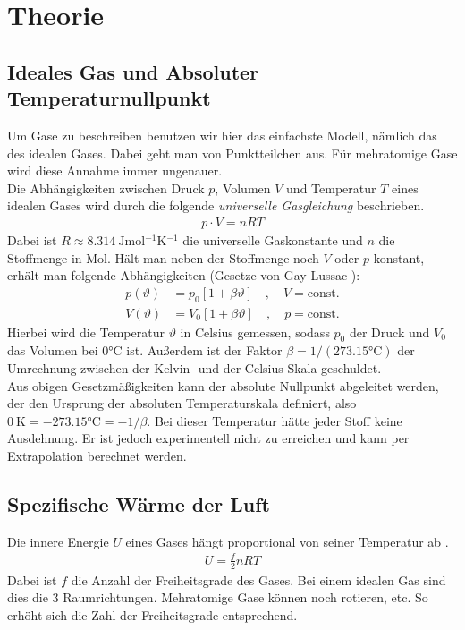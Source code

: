 \documentclass[12pt,a4paper,titlepage,headinclude,bibtotoc]{scrartcl}
\begin{document}
\section{Theorie}
\label{sec:theorie}
\subsection{Ideales Gas und Absoluter Temperaturnullpunkt}
Um Gase zu beschreiben benutzen wir hier das einfachste Modell, nämlich das des idealen Gases.
Dabei geht man von Punktteilchen aus.
Für mehratomige Gase wird diese Annahme immer ungenauer.\\
Die Abhängigkeiten zwischen Druck $p$, Volumen $V$ und Temperatur $T$ eines idealen Gases wird durch die folgende \textit{universelle Gasgleichung} \cite[S.261]{gerthsen} beschrieben.
\begin{align}
 p \cdot V = nRT
 \label{eq:uGasGl}
\end{align}
Dabei ist $R\approx 8.314 ~ \si{\joule \mol^{-1} \kelvin^{-1}}$ die universelle Gaskonstante und $n$ die Stoffmenge in Mol.
Hält man neben der Stoffmenge noch $V$ oder $p$ konstant, erhält man folgende Abhängigkeiten (Gesetze von Gay-Lussac \cite[S.261]{gerthsen}):
\begin{align}
	p(\vartheta)&=p_0 [1+\beta\vartheta] \quad, \quad V =\text{const.}
	\label{eq:p(T)}\\
	V(\vartheta)&=V_0 [1+\beta\vartheta] \quad, \quad p=\text{const.}	
\end{align}
Hierbei wird die Temperatur $\vartheta$ in Celsius gemessen, sodass $p_0$ der Druck und $V_0$ das Volumen bei $0\si{\celsius}$ ist.
Außerdem ist der Faktor $\beta=1/(273.15 \si{\celsius})$ der Umrechnung zwischen der Kelvin- und der Celsius-Skala geschuldet.\\
Aus obigen Gesetzmäßigkeiten kann der absolute Nullpunkt abgeleitet werden, der den Ursprung der absoluten Temperaturskala definiert, also $0~\si{\kelvin}=-273.15 \si{\celsius}=-1/\beta$.
Bei dieser Temperatur hätte jeder Stoff keine Ausdehnung.
Er ist jedoch experimentell nicht zu erreichen und kann per Extrapolation berechnet werden.

\subsection{Spezifische Wärme der Luft}
Die innere Energie $U$ eines Gases hängt proportional von seiner Temperatur ab \cite[S.257]{gerthsen}.
\begin{align}
	U=\frac{f}{2} n R T
\end{align}
Dabei ist $f$ die Anzahl der Freiheitsgrade des Gases.
Bei einem idealen Gas sind dies die 3 Raumrichtungen.
Mehratomige Gase können noch rotieren, etc.
So erhöht sich die Zahl der Freiheitsgrade entsprechend.\\
\end{document}

